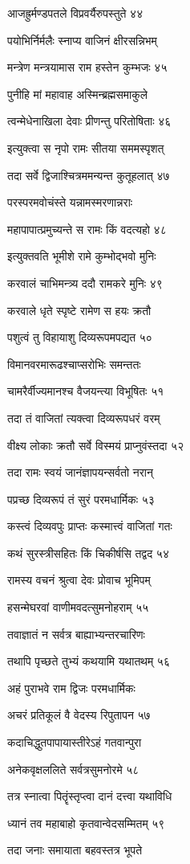 आजह्रुर्मण्डपतले विप्रवर्यैरुपस्तुते ४४

पयोभिर्निर्मलैः स्नाप्य वाजिनं क्षीरसन्निभम्

मन्त्रेण मन्त्रयामास राम हस्तेन कुम्भजः ४५

पुनीहि मां महावाह अस्मिन्ब्रह्मसमाकुले

त्वन्मेधेनाखिला देवाः प्रीणन्तु परितोषिताः ४६

इत्युक्त्वा स नृपो रामः सीतया सममस्पृशत्

तदा सर्वे द्विजाश्चित्रममन्यन्त कुतूहलात् ४७

परस्परमवोचंस्ते यन्नामस्मरणान्नराः

महापापात्प्रमुच्यन्ते स रामः किं वदत्यहो ४८

इत्युक्तवति भूमीशे रामे कुम्भोद्भवो मुनिः

करवालं चाभिमन्त्र्य ददौ रामकरे मुनिः ४९

करवाले धृते स्पृष्टे रामेण स हयः क्रतौ

पशुत्वं तु विहायाशु दिव्यरूपमपद्यत ५०

विमानवरमारूढश्चाप्सरोभिः समन्ततः

चामरैर्वीज्यमानश्च वैजयन्त्या विभूषितः ५१

तदा तं वाजितां त्यक्त्वा दिव्यरूपधरं वरम्

वीक्ष्य लोकाः क्रतौ सर्वे विस्मयं प्राप्नुवंस्तदा ५२

तदा रामः स्वयं जानंज्ञापयन्सर्वतो नरान्

पप्रच्छ दिव्यरूपं तं सुरं परमधार्मिकः ५३

कस्त्वं दिव्यवपुः प्राप्तः कस्मात्त्वं वाजितां गतः

कथं सुरस्त्रीसहितः किं चिकीर्षसि तद्वद ५४

रामस्य वचनं श्रुत्वा देवः प्रोवाच भूमिपम्

हसन्मेघरवां वाणीमवदत्सुमनोहराम् ५५

तवाज्ञातं न सर्वत्र बाह्याभ्यन्तरचारिणः

तथापि पृच्छते तुभ्यं कथयामि यथातथम् ५६

अहं पुराभवे राम द्विजः परमधार्मिकः

अचरं प्रतिकूलं वै वेदस्य रिपुतापन ५७

कदाचिद्धुतपापायास्तीरेऽहं गतवान्पुरा

अनेकवृक्षललिते सर्वत्रसुमनोरमे ५८

तत्र स्नात्वा पितॄंस्तृप्त्वा दानं दत्त्वा यथाविधि

ध्यानं तव महाबाहो कृतवान्वेदसम्मितम् ५९

तदा जनाः समायाता बहवस्तत्र भूपते

